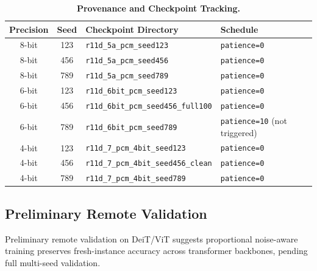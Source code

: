 \begin{table}[htbp]
\centering
\caption{\textbf{Provenance and Checkpoint Tracking.}}
\label{tab:supp_provenance}
\scriptsize
\setlength{\tabcolsep}{3pt}
\begin{tabular}{@{}ccp{}p{}@{}}
\toprule
\textbf{Precision} & \textbf{Seed} & \textbf{Checkpoint Directory} & \textbf{Schedule} \\
\midrule
8-bit & 123 & \texttt{r11d\_5a\_pcm\_seed123} & \texttt{patience=0} \\
8-bit & 456 & \texttt{r11d\_5a\_pcm\_seed456} & \texttt{patience=0} \\
8-bit & 789 & \texttt{r11d\_5a\_pcm\_seed789} & \texttt{patience=0} \\
6-bit & 123 & \texttt{r11d\_6bit\_pcm\_seed123} & \texttt{patience=0} \\
6-bit & 456 & \texttt{r11d\_6bit\_pcm\_seed456\_full100} & \texttt{patience=0} \\
6-bit & 789 & \texttt{r11d\_6bit\_pcm\_seed789} & \texttt{patience=10} \newline (not triggered) \\
4-bit & 123 & \texttt{r11d\_7\_pcm\_4bit\_seed123} & \texttt{patience=0} \\
4-bit & 456 & \texttt{r11d\_7\_pcm\_4bit\_seed456\_clean} & \texttt{patience=0} \\
4-bit & 789 & \texttt{r11d\_7\_pcm\_4bit\_seed789} & \texttt{patience=0} \\
\bottomrule
\end{tabular}
\end{table}

\subsection{Preliminary Remote Validation}
\label{subsec:supp-remote-validation}

Preliminary remote validation on DeiT/ViT suggests proportional noise-aware training preserves fresh-instance accuracy across transformer backbones, pending full multi-seed validation.
